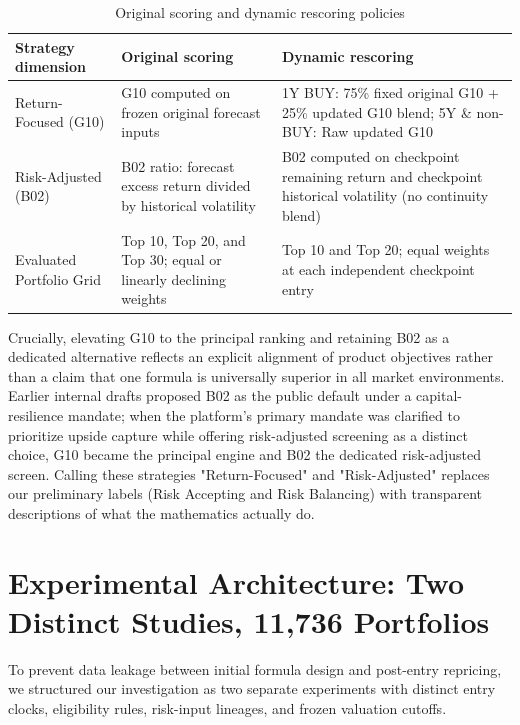 \documentclass[11pt,a4paper]{article}
\numberwithin{table}{section}
\begin{document}
\begin{minipage}{\linewidth}
\begin{center}\small\setlength{\tabcolsep}{3pt}\renewcommand{\arraystretch}{1.18}
\begin{longtable}{@{}p{.19\linewidth}p{.32\linewidth}p{.42\linewidth}@{}}
\caption{Original scoring and dynamic rescoring policies}\\
\toprule
Strategy dimension & Original scoring & Dynamic rescoring\\\midrule\endhead
Return-Focused (G10) & G10 computed on frozen original forecast inputs & 1Y BUY: 75\% fixed original G10 + 25\% updated G10 blend; 5Y \& non-BUY: Raw updated G10\\
Risk-Adjusted (B02) & B02 ratio: forecast excess return divided by historical volatility & B02 computed on checkpoint remaining return and checkpoint historical volatility (no continuity blend)\\
Evaluated Portfolio Grid & Top 10, Top 20, and Top 30; equal or linearly declining weights & Top 10 and Top 20; equal weights at each independent checkpoint entry\\
\bottomrule\end{longtable}\end{center}
\end{minipage}\par
Crucially, elevating G10 to the principal ranking and retaining B02 as a dedicated alternative reflects an explicit alignment of product objectives rather than a claim that one formula is universally superior in all market environments. Earlier internal drafts proposed B02 as the public default under a capital-resilience mandate; when the platform's primary mandate was clarified to prioritize upside capture while offering risk-adjusted screening as a distinct choice, G10 became the principal engine and B02 the dedicated risk-adjusted screen. Calling these strategies "Return-Focused" and "Risk-Adjusted" replaces our preliminary labels (Risk Accepting and Risk Balancing) with transparent descriptions of what the mathematics actually do.

\section{Experimental Architecture: Two Distinct Studies, 11,736 Portfolios}

To prevent data leakage between initial formula design and post-entry repricing, we structured our investigation as two separate experiments with distinct entry clocks, eligibility rules, risk-input lineages, and frozen valuation cutoffs.
\end{document}
